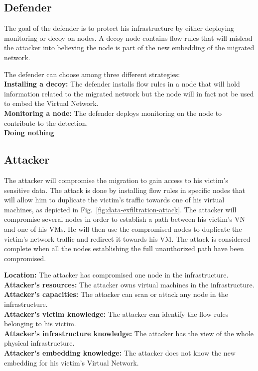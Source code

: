 \subsection{Defender}
The goal of the defender is to protect his infrastructure by either deploying monitoring or decoy on nodes. A decoy node contains flow rules that will mislead the attacker into believing the node is part of the new embedding of the migrated network.

The defender can choose among three different strategies:\\
\textbf{Installing a decoy: } The defender installs flow rules in a node that will hold information related to the migrated network but the node will in fact not be used to embed the Virtual Network.\\
\textbf{Monitoring a node: } The defender deploys monitoring on the node to contribute to the detection.\\
\textbf{Doing nothing}

\subsection{Attacker}
The attacker will compromise the migration to gain access to his victim's sensitive data.
The attack is done by installing flow rules in specific nodes that will allow him to duplicate the victim's traffic towards one of his virtual machines, as depicted in Fig.~\ref{fig:data-exfiltration-attack}. 
The attacker will compromise several nodes in order to establish a path between his victim's VN and one of his VMs.
He will then use the compromised nodes to duplicate the victim's network traffic and redirect it towards his VM.
The attack is considered complete when all the nodes establishing the full unauthorized path have been compromised.

\textbf{Location: } The attacker has compromised one node in the infrastructure.\\
\textbf{Attacker's resources: } The attacker owns virtual machines in the infrastructure.\\
\textbf{Attacker's capacities: } The attacker can scan or attack any node in the infrastructure.\\
\textbf{Attacker's victim knowledge: } The attacker can identify the flow rules belonging to his victim.\\
\textbf{Attacker's infrastructure knowledge: } The attacker has the view of the whole physical infrastructure.\\
\textbf{Attacker's embedding knowledge: } The attacker does not know the new embedding for his victim's Virtual Network.


